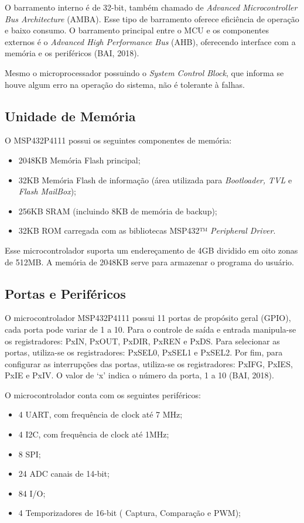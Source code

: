O barramento interno é de 32-bit, também chamado de \textit{Advanced Microcontroller Bus Architecture} (AMBA). Esse tipo de barramento oferece eficiência de operação e baixo consumo. O barramento principal entre o MCU e os componentes externos é o \textit{Advanced High Performance Bus} (AHB), oferecendo interface com a memória e os periféricos (BAI, 2018).

Mesmo o microprocessador possuindo o \textit{System Control Block}, que informa se houve algum erro na operação do sistema, não é tolerante à falhas. 

\subsection{Unidade de Memória}

O MSP432P4111 possui os seguintes componentes de memória:

\begin{itemize}
\item 2048KB Memória Flash principal;
\item 32KB Memória Flash de informação (área utilizada para \textit{Bootloader, TVL} e \textit{Flash MailBox});
\item 256KB SRAM (incluindo 8KB de memória de backup);
\item 32KB ROM carregada com as bibliotecas MSP432™ \textit{Peripheral Driver}.
\end{itemize}

Esse microcontrolador suporta um endereçamento de 4GB dividido em oito zonas de 512MB. A memória de 2048KB serve para armazenar o programa do usuário.

\subsection{Portas e Periféricos}

O microcontrolador MSP432P4111 possui 11 	portas de propósito geral (GPIO), cada porta pode variar de 1 a 10. Para o controle de saída e entrada manipula-se os registradores: PxIN, PxOUT, PxDIR, PxREN e PxDS. Para selecionar as portas, utiliza-se os registradores: PxSEL0, PxSEL1 e PxSEL2. Por fim, para configurar as interrupções das portas, utiliza-se os registradores: PxIFG, PxIES, PxIE e PxIV. O valor de ‘x’ indica o número da porta, 1 a 10 (BAI, 2018).

O microcontrolador conta com os seguintes periféricos:

\begin{itemize}
\item 4 UART, com frequência de clock até 7 MHz;
\item 4 I2C, com frequência de clock até 1MHz;
\item 8 SPI;
\item 24 ADC canais de 14-bit;
\item 84 I/O;
\item 4 Temporizadores de 16-bit ( Captura, Comparação e PWM);
\end{itemize}

